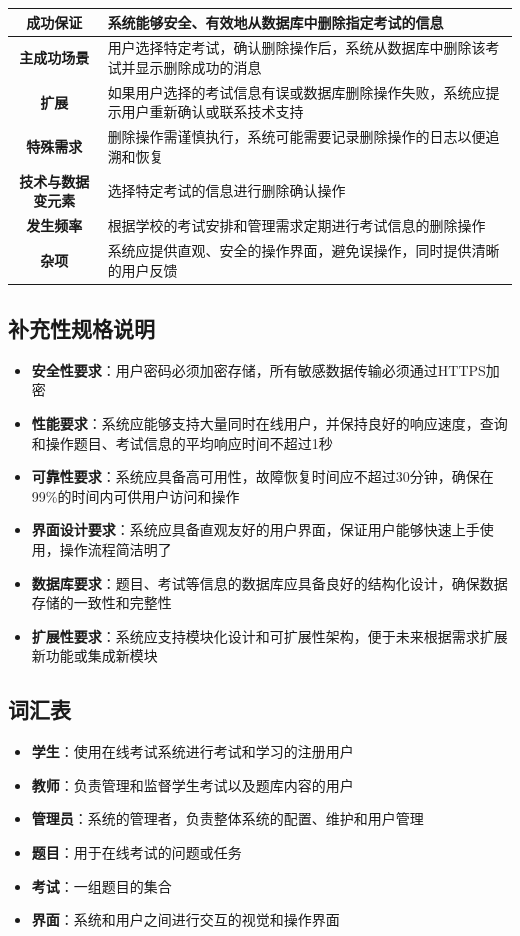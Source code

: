 \documentclass{article}
\begin{document}
\begin{centering}
\begin{longtable}{|c|m{11cm}<{\centering}|}
\textbf{成功保证} & 系统能够安全、有效地从数据库中删除指定考试的信息 \\ \hline
\textbf{主成功场景} & 用户选择特定考试，确认删除操作后，系统从数据库中删除该考试并显示删除成功的消息 \\ \hline
\textbf{扩展} & 如果用户选择的考试信息有误或数据库删除操作失败，系统应提示用户重新确认或联系技术支持 \\ \hline
\textbf{特殊需求} & 删除操作需谨慎执行，系统可能需要记录删除操作的日志以便追溯和恢复 \\ \hline
\textbf{技术与数据变元素} & 选择特定考试的信息进行删除确认操作 \\ \hline
\textbf{发生频率} & 根据学校的考试安排和管理需求定期进行考试信息的删除操作 \\ \hline
\textbf{杂项} & 系统应提供直观、安全的操作界面，避免误操作，同时提供清晰的用户反馈 \\ \hline
\end{longtable}
\end{centering}

\subsection{补充性规格说明}
\begin{itemize}
    \item \textbf{安全性要求}：用户密码必须加密存储，所有敏感数据传输必须通过HTTPS加密
    \item \textbf{性能要求}：系统应能够支持大量同时在线用户，并保持良好的响应速度，查询和操作题目、考试信息的平均响应时间不超过1秒
    \item \textbf{可靠性要求}：系统应具备高可用性，故障恢复时间应不超过30分钟，确保在99\%的时间内可供用户访问和操作
    \item \textbf{界面设计要求}：系统应具备直观友好的用户界面，保证用户能够快速上手使用，操作流程简洁明了
    \item \textbf{数据库要求}：题目、考试等信息的数据库应具备良好的结构化设计，确保数据存储的一致性和完整性
    \item \textbf{扩展性要求}：系统应支持模块化设计和可扩展性架构，便于未来根据需求扩展新功能或集成新模块
\end{itemize}

\subsection{词汇表}
\begin{itemize}
    \item \textbf{学生}：使用在线考试系统进行考试和学习的注册用户
    \item \textbf{教师}：负责管理和监督学生考试以及题库内容的用户
    \item \textbf{管理员}：系统的管理者，负责整体系统的配置、维护和用户管理
    \item \textbf{题目}：用于在线考试的问题或任务
    \item \textbf{考试}：一组题目的集合
    \item \textbf{界面}：系统和用户之间进行交互的视觉和操作界面
\end{itemize}
\end{document}
